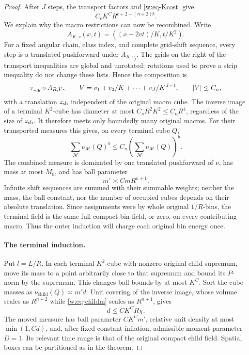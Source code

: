 \begin{proof}
After $J$ steps, the transport factors and \eqref{w:eq-Kcost} give
\begin{equation}\label{w:eq-angular-factor}
 C_\epsilon K^C R^{\epsilon+2-(n+2)b}.
\end{equation}
We explain why the macro restrictions can now be recombined.  Write
\[
 A_{K,v}(x,t)=((x-2vt)/K,t/K^2).
\]
For a fixed angular chain, class index, and complete grid-shift
sequence, every step is a translated pushforward under $A_{K,v_j}$.
The grids on the right of the transport inequalities are global and
unrotated; rotations used to prove a strip inequality do not change
these lists.  Hence the composition is
\begin{equation}\label{w:eq-affine-composition}
 \tau_{z_{\rm sh}}\circ A_{R,V},\qquad
 V=v_1+v_2/K+\cdots+v_J/K^{J-1},\qquad |V|\leq C_n,
\end{equation}
with a translation $z_{\rm sh}$ independent of the original macro cube.
The inverse image of a terminal $K^2$-cube has diameter at most
$C_nR^2K^2\leq C_nR^4$, regardless of the size of $z_{\rm sh}$.  It therefore
meets only boundedly many original macros.  For their transported
measures this gives, on every terminal cube $Q$,
\[
 \sum_{\mathcal M}\nu_{\mathcal M}(Q)^b
 \leq C_n\left(\sum_{\mathcal M}\nu_{\mathcal M}(Q)\right)^b.
\]
The combined measure is dominated by one translated pushforward of
$\nu$, has mass at most $M_0$, and has ball parameter
\begin{equation}\label{w:eq-childm}
 m'\asymp C mR^{n+1}.
\end{equation}
Infinite shift sequences are summed with their summable weights;
neither the mass, the ball constant, nor the number of occupied cubes
depends on their absolute translation.  Since assignments were by
whole original $1/R$-bins, the terminal field is the same full compact
bin field, or zero, on every contributing macro.  Thus the outer
induction will charge each original bin energy once.

\paragraph{The terminal induction.}
Put $l=L/R$.  In each terminal $K^2$-cube with nonzero original child
supremum, move its mass to a point arbitrarily close to that supremum
and bound its $P$-norm by the supremum.  This changes ball bounds by
at most $K^C$.  Sort the cube masses as $\nu_{\mathrm{child}}(Q)\asymp
m'd$.  Unit covering of the inverse image, whose volume scales as
$R^{n+2}$ while \eqref{w:eq-childm} scales as $R^{n+1}$, gives
\begin{equation}\label{w:eq-dcap}
 d\leq CK^C R\chi.
\end{equation}
The moved measure has ball parameter $CK^Cm'$, relative unit density
at most $\min(1,Cd)$, and, after fixed constant inflation, admissible
moment parameter $D=1$.  Its relevant time range is that of the
original compact child field.  Spatial boxes can be partitioned as
in the theorem.


\end{proof}
